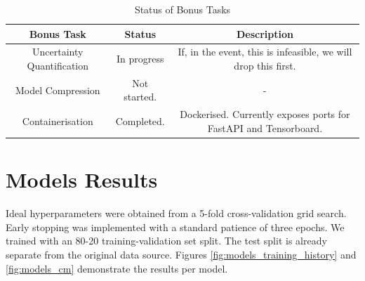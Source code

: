 \documentclass{article}
\begin{document}
\begin{table}[!h]
    \centering
    \begin{tabular}{|c|c|c|}
        \hline
        \textbf{Bonus Task} & \textbf{Status} & \textbf{Description} \\
        \hline
        \hline
        Uncertainty Quantification & In progress & If, in the event, this is infeasible, we will drop this first. \\
        \hline
        Model Compression & Not started. & - \\
        \hline
        Containerisation & Completed. & Dockerised. Currently exposes ports for FastAPI and Tensorboard. \\
        \hline
    \end{tabular}
    \caption{Status of Bonus Tasks}
    \label{tab:status_bonus}
\end{table}

\section{Models Results}

Ideal hyperparameters were obtained from a 5-fold cross-validation grid search. Early stopping was implemented with a standard patience of three epochs. We trained with an 80-20 training-validation set split. The test split is already separate from the original data source. Figures \ref{fig:models_training_history} and \ref{fig:models_cm} demonstrate the results per model.
\end{document}
